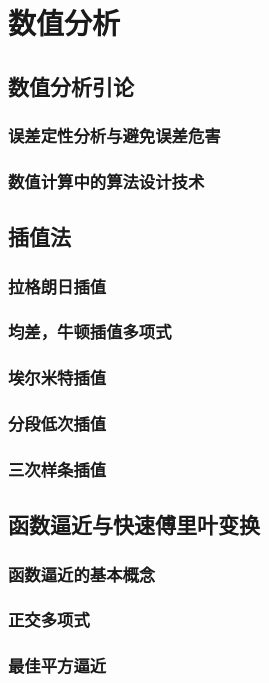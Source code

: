 \part{数值分析}
\chapter{数值分析引论}


\section{误差定性分析与避免误差危害}
\section{数值计算中的算法设计技术}

\chapter{插值法}
\section{拉格朗日插值}
\section{均差，牛顿插值多项式}
\section{埃尔米特插值}
\section{分段低次插值}
\section{三次样条插值}

\chapter{函数逼近与快速傅里叶变换}
\section{函数逼近的基本概念}
\section{正交多项式}
\section{最佳平方逼近}

